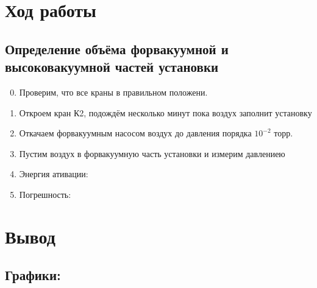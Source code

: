 \documentclass[11pt,a4paper]{article}
\begin{document}
\section*{Ход работы}
\subsection*{Определение объёма форвакуумной и высоковакуумной
частей установки}
\begin{enumerate}
  \setcounter{enumi}{-1}
  \item Проверим, что все краны в правильном положени.
  \item Откроем кран К2, подождём несколько минут пока воздух заполнит установку
  \item Откачаем форвакуумным насосом воздух до давления порядка $10^{-2}$ торр.
  \item Пустим воздух в форвакуумную часть установки и измерим давлениею
  \item Энергия ативации:
  \item Погрешность:
\end{enumerate}

\section*{Вывод}
\subsection*{\textbf{Графики:}}
\begin{figure}[h]
  \label{fig:graph1}
\end{figure}
\newpage
\begin{figure}[h]
  \label{fig:graph2}
\end{figure}
\end{document}
